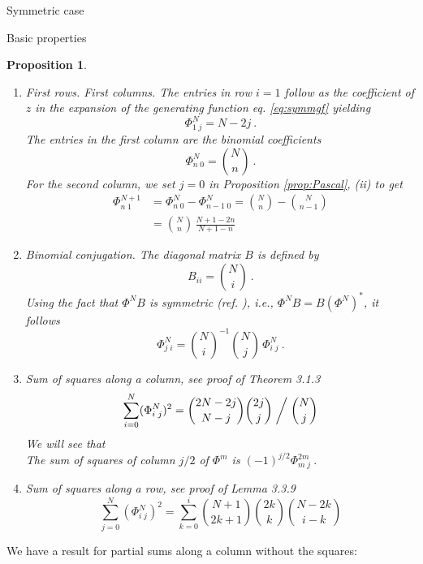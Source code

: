 \documentclass[12pt,reqno]{amsart}
\newtheorem{proposition}[theorem]{Proposition}  %
\newcommand{\FF}[2]{\Phi^{#1}_{#2}}
\begin{document}
\begin{section}{Symmetric case}
\begin{subsection}{Basic properties}
\begin{proposition}
\begin{enumerate}
\item First rows. First columns.
The entries in row $i=1$ follow as the coefficient of $z$ in the expansion of the generating function
eq. \eqref{eq:symmgf} yielding
$$\FF{N}{1\;j}=N-2j\ .$$
The entries in the first column are the binomial coefficients 
$$\FF{N}{n\;0}=\binom{N}{n}\ .$$
 For the second column, we set $j=0$ in Proposition \ref{prop:Pascal}, (ii) to get
\begin{align}\label{eq:columnone}
\Phi_{n\;1}^{N+1}&=\Phi_{n\;0}^N-\Phi_{n-1\;0}^N=\binom{N}{n}-\binom{N}{n-1}\\ 
&=\binom{N}{n}\,\frac{N+1-2n}{N+1-n}
\end{align}



\item Binomial conjugation.
The diagonal matrix $B$ is defined by
$$B_{ii}=\binom{N}{i}\ .$$
Using the fact that $\FF{N}{}B$ is symmetric (ref.  \cite{FF}), i.e., $\FF{N}{}B=B(\FF{N}{})^*$, it follows
\begin{equation}\label{eq:binom}
\FF{N}{j\;i}=\binom{N}{i}^{-1}\binom{N}{j}\,\FF{N}{i\;j}\ .
\end{equation}
\item Sum of squares along a column, see \cite{FF} proof of Theorem 3.1.3
\begin{equation}\label{eq:colsquares}
\sum_{i=0}^N (\FF{N}{i\;j})^2=\binom{2N-2j}{N-j}\binom{2j}{j}\biggm/\binom{N}{j}
\end{equation}
We will see that\\

The sum of squares of column $j/2$ of $\FF{m}{}$ is $(-1)^{j/2}\FF{2m}{m\;j}\ .$\\

\item Sum of squares along a row, see \cite{FF} proof of Lemma 3.3.9
\begin{equation}\label{eq:rowsquares}
\sum_{j=0}^N (\FF{N}{i\;j})^2=\sum_{k=0}^i \binom{N+1}{2k+1}\binom{2k}{k}\binom{N-2k}{i-k}
\end{equation}
\end{enumerate}
\end{proposition}
\end{subsection}

We have a result for partial sums along a column without the squares:


\end{section}
\end{document}
